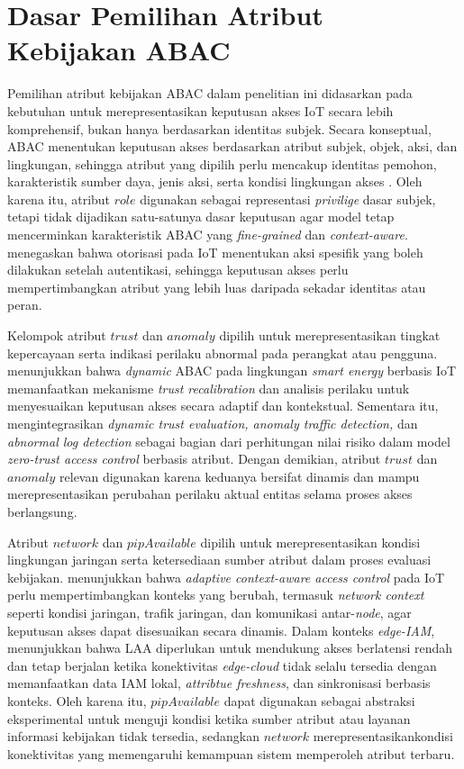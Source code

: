 \section{Dasar Pemilihan Atribut Kebijakan ABAC}

Pemilihan atribut kebijakan ABAC dalam penelitian ini didasarkan pada kebutuhan untuk merepresentasikan keputusan akses IoT secara lebih komprehensif, bukan hanya berdasarkan identitas subjek. Secara konseptual, ABAC menentukan keputusan akses berdasarkan atribut subjek, objek, aksi, dan lingkungan, sehingga atribut yang dipilih perlu mencakup identitas pemohon, karakteristik sumber daya, jenis aksi, serta kondisi lingkungan akses \parencite{hu_guide_2014}. Oleh karena itu, atribut $role$ digunakan sebagai representasi \textit{privilige} dasar subjek, tetapi tidak dijadikan satu-satunya dasar keputusan agar model tetap mencerminkan karakteristik ABAC yang \textit{fine-grained} dan \textit{context-aware}. \textcite{diaz_authorization_2025} menegaskan bahwa otorisasi pada IoT menentukan aksi spesifik yang boleh dilakukan setelah autentikasi, sehingga keputusan akses perlu mempertimbangkan atribut yang lebih luas daripada sekadar identitas atau peran.

Kelompok atribut $trust$ dan $anomaly$ dipilih untuk merepresentasikan tingkat kepercayaan serta indikasi perilaku abnormal pada perangkat atau pengguna. \textcite{waheed_blockchain-based_2025} menunjukkan bahwa \textit{dynamic} ABAC pada lingkungan \textit{smart energy} berbasis IoT memanfaatkan mekanisme \textit{trust recalibration} dan analisis perilaku untuk menyesuaikan keputusan akses secara adaptif dan kontekstual. Sementara itu, \textcite{mao_zero-trust_2025} mengintegrasikan \textit{dynamic trust evaluation, anomaly traffic detection,} dan \textit{abnormal log detection} sebagai bagian dari perhitungan nilai risiko dalam model \textit{zero-trust access control} berbasis atribut. Dengan demikian, atribut $trust$ dan $anomaly$ relevan digunakan karena keduanya bersifat dinamis dan mampu merepresentasikan perubahan perilaku aktual entitas selama proses akses berlangsung.

Atribut $network$ dan $pipAvailable$ dipilih untuk merepresentasikan kondisi lingkungan jaringan serta ketersediaan sumber atribut dalam proses evaluasi kebijakan. \textcite{kalaria_adaptive_2024} menunjukkan bahwa \textit{adaptive context-aware access control} pada IoT perlu mempertimbangkan konteks yang berubah, termasuk \textit{network context} seperti kondisi jaringan, trafik jaringan, dan komunikasi antar-\textit{node}, agar keputusan akses dapat disesuaikan secara dinamis. Dalam konteks \textit{edge-IAM}, \textcite{wang_edge-enabled_2025} menunjukkan bahwa LAA diperlukan untuk mendukung akses berlatensi rendah dan tetap berjalan ketika konektivitas \textit{edge-cloud} tidak selalu tersedia dengan memanfaatkan data IAM lokal, \textit{attribtue freshness}, dan sinkronisasi berbasis konteks. Oleh karena itu, $pipAvailable$ dapat digunakan sebagai abstraksi eksperimental untuk menguji kondisi ketika sumber atribut atau layanan informasi kebijakan tidak tersedia, sedangkan $network$ merepresentasikankondisi konektivitas yang memengaruhi kemampuan sistem memperoleh atribut terbaru.

